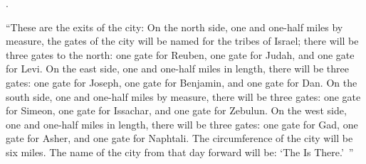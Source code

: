 {{}.
\par }{\PP {}“These
are the exits
of the city: On the north
side,
one and one-half miles
by measure,
the gates
of the city
will be named
for the tribes
of Israel;
there will be three
gates
to the north: one
gate
for Reuben,
one
gate
for Judah,
and one
gate
for Levi.
On the east
side,
one and one-half miles
in length, there will be three
gates: one
gate
for Joseph,
one
gate
for Benjamin,
and one
gate
for Dan.
On the south
side,
one and one-half miles
by measure,
there will be three
gates: one
gate
for Simeon,
one
gate
for Issachar,
and one
gate
for Zebulun.
On the west
side,
one and one-half miles
in length, there will be three
gates: one
gate
for Gad,
one
gate
for Asher,
and one
gate
for Naphtali.
The circumference
of the city will be six miles.
The name
of the city
from that day
forward will be: ‘The
{}
Is There.’ ”
\par }